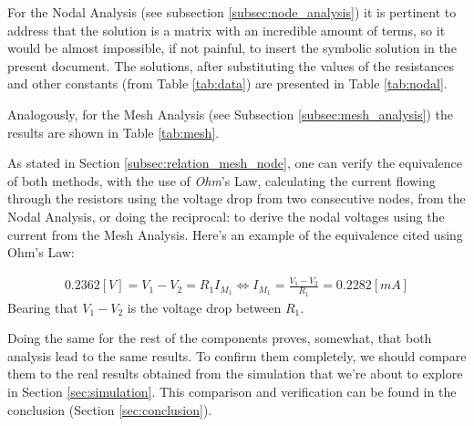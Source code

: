 For the Nodal Analysis (see subsection \ref{subsec:node_analysis}) it is pertinent to address that the solution is a matrix with an incredible amount of terms, so it would be almost impossible, if not painful, to insert the symbolic solution in the present document. The solutions, after substituting the values of the resistances and other constants (from Table \ref{tab:data}) are presented in Table \ref{tab:nodal}.

Analogously, for the Mesh Analysis (see Subsection \ref{subsec:mesh_analysis}) the results are shown in Table \ref{tab:mesh}.

As stated in Section \ref{subsec:relation_mesh_node}, one can verify the equivalence of both methods, with the use of \textit{Ohm}'s Law, calculating the current flowing through the resistors using the voltage drop from two consecutive nodes, from the Nodal Analysis, or doing the reciprocal: to derive the nodal voltages using the current from the Mesh Analysis.
Here's an example of the equivalence cited using Ohm's Law:

\begin{align}
    0.2362 [V] = V_1-V_2 = R_1I_{M_1} 
    \Longleftrightarrow I_{M_1} = \frac{V_1-V_2}{R_1} = 0.2282 [mA]  
\end{align}
Bearing that $V_1-V_2$ is the voltage drop between $R_1$.

Doing the same for the rest of the components proves, somewhat, that both analysis lead to the same results. To confirm them completely, we should compare them to the real results obtained from the simulation that we're about to explore in Section \ref{sec:simulation}. This comparison and verification can be found in the conclusion (Section \ref{sec:conclusion}).

\clearpage
